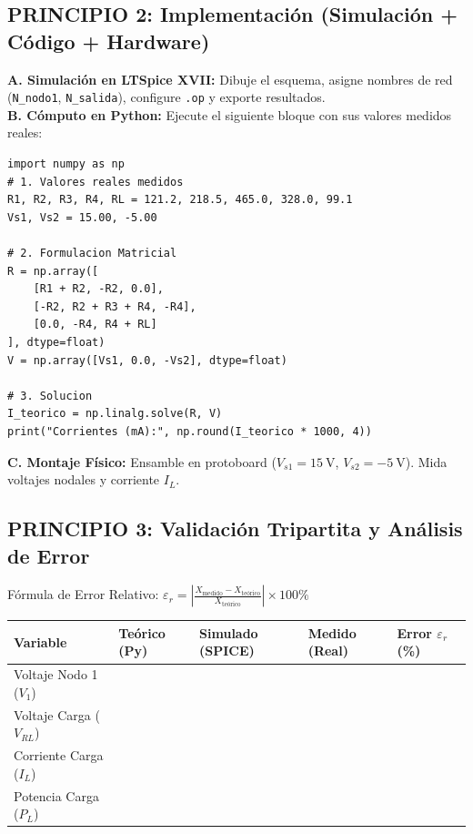 \documentclass[11pt,a4paper]{article}
\begin{document}
\subsection*{PRINCIPIO 2: Implementación (Simulación + Código + Hardware)}
\textbf{A. Simulación en LTSpice XVII:} Dibuje el esquema, asigne nombres de red (\texttt{N\_nodo1}, \texttt{N\_salida}), configure \texttt{.op} y exporte resultados.\\
\textbf{B. Cómputo en Python:} Ejecute el siguiente bloque con sus valores medidos reales:
\begin{lstlisting}
import numpy as np
# 1. Valores reales medidos
R1, R2, R3, R4, RL = 121.2, 218.5, 465.0, 328.0, 99.1
Vs1, Vs2 = 15.00, -5.00

# 2. Formulacion Matricial
R = np.array([
    [R1 + R2, -R2, 0.0],
    [-R2, R2 + R3 + R4, -R4],
    [0.0, -R4, R4 + RL]
], dtype=float)
V = np.array([Vs1, 0.0, -Vs2], dtype=float)

# 3. Solucion
I_teorico = np.linalg.solve(R, V)
print("Corrientes (mA):", np.round(I_teorico * 1000, 4))
\end{lstlisting}
\textbf{C. Montaje Físico:} Ensamble en protoboard ($V_{s1}=\qty{15}{\volt}$, $V_{s2}=\qty{-5}{\volt}$). Mida voltajes nodales y corriente $I_L$.

\subsection*{PRINCIPIO 3: Validación Tripartita y Análisis de Error}
Fórmula de Error Relativo: $\varepsilon_r = \left\vert \frac{X_{\text{medido}} - X_{\text{teórico}}}{X_{\text{teórico}}} \right\vert \times 100\%$

\begin{table}[h!]
    \centering
    \begin{tabularx}{\textwidth}{@{}lXXXX@{}}
        \toprule
        \textbf{Variable} & \textbf{Teórico (Py)} & \textbf{Simulado (SPICE)} & \textbf{Medido (Real)} & \textbf{Error $\varepsilon_r$ (\%)} \\
        \midrule
        Voltaje Nodo 1 ($V_1$) & & & & \\
        Voltaje Carga ($V_{RL}$) & & & & \\
        Corriente Carga ($I_L$) & & & & \\
        Potencia Carga ($P_L$) & & & & \\
        \bottomrule
    \end{tabularx}
\end{table}
\end{document}
